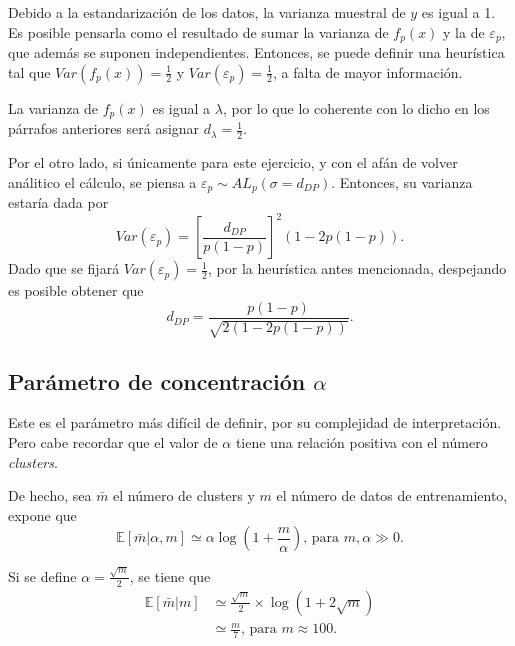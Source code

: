 Debido a la estandarizaci\'on de los datos, la varianza muestral de $y$ es igual a 1. Es posible pensarla como el resultado de sumar la varianza de $f_p(x)$ y la de $\varepsilon_p$, que adem\'as se suponen independientes. Entonces, se puede definir una heur\'istica tal que $Var(f_p(x)) = \frac{1}{2}$ y $Var(\varepsilon_p) = \frac{1}{2}$, a falta de mayor informaci\'on.

La varianza de $f_p(x)$ es igual a $\lambda$, por lo que lo coherente con lo dicho en los p\'arrafos anteriores ser\'a asignar $d_\lambda = \frac{1}{2}$. 

Por el otro lado, si \'unicamente para este ejercicio, y con el af\'an de volver an\'alitico el c\'alculo, se piensa a $\varepsilon_p \sim AL_p(\sigma = d_{DP})$. Entonces, su varianza estar\'ia dada por
\begin{equation*}
    Var(\varepsilon_p) = 
    \left[\frac{d_{DP}}{p(1-p)}\right]^2
    (1-2p(1-p)).
\end{equation*}
Dado que se fijar\'a $Var(\varepsilon_p) = \frac{1}{2}$, por la heur\'istica antes mencionada, despejando es posible obtener que
\begin{equation*}
    d_{DP} = \frac{p(1-p)}{\sqrt{2(1-2p(1-p))}}.
\end{equation*}

\subsection{Par\'ametro de concentraci\'on $\alpha$}

Este es el par\'ametro m\'as dif\'icil de definir, por su complejidad de interpretaci\'on. Pero cabe recordar que el valor de $\alpha$ tiene una relaci\'on positiva con el n\'umero \textit{clusters}. 

De hecho, sea $\bar{m}$ el n\'umero de clusters y $m$ el n\'umero de datos de entrenamiento, \cite{Yee_DirProc} expone que
\begin{equation*}
    \mathbb{E}[\bar{m}|\alpha, m] 
    \simeq 
    \alpha
    \log 
    \left(
        1 + \frac{m}{\alpha}
    \right)
    \text{, para } m, \alpha \gg 0.
\end{equation*}

Si se define $\alpha = \frac{\sqrt{m}}{2}$, se tiene que
\begin{equation*}
\begin{aligned}
    \mathbb{E}[\bar{m}|m] 
    &\simeq 
    \frac{\sqrt{m}}{2}
    \times
    \log 
    \left(
        1 + 2\sqrt{m}
    \right)\\
    &\simeq
    \frac{m}{7} 
    \text{, para } m \approx 100.
\end{aligned}
\end{equation*}

